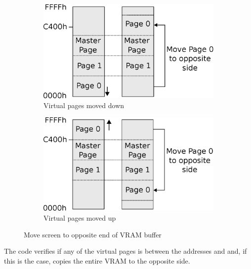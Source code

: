 \documentclass[book.tex]{subfiles}
\begin{document}
\begin{figure}[H]
\centering
\begin{subfigure}{.5\textwidth}
  \centering
  \includegraphics[width=.9\textwidth]{imgs/drawings/Page_down_switch.eps}
  \caption*{Virtual pages moved down}
  \label{fig:page0_down}
\end{subfigure}%
\begin{subfigure}{.5\textwidth}
  \centering
  \includegraphics[width=.9\textwidth]{imgs/drawings/Page_up_switch.eps}
    \caption*{Virtual pages moved up}
  \label{fig:page0_up}
\end{subfigure}
\caption{Move screen to opposite end of VRAM buffer}
\label{fig:page_wrapping}
\end{figure}
\par

The code verifies if any of the virtual pages is between the addresses  and  and, if this is the case, copies the entire VRAM to the opposite side.\\
\end{document}
